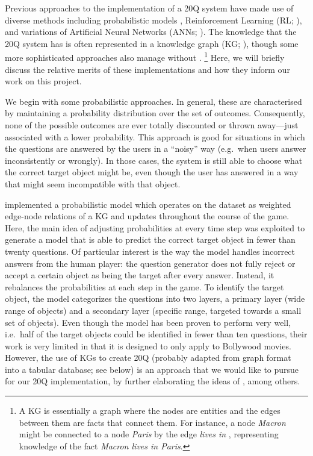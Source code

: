 \documentclass[11pt,a4paper]{article}
\begin{document}
Previous approaches to the implementation of a 20Q system have made use of diverse methods including probabilistic models \citep{DeyEa2019}, Reinforcement Learning (RL; \citealt{HuEa2018}), and variations of Artificial Neural Networks (ANNs; \citealt{ReddyEa2017, Burgener2006, ToninEa2018}).
The knowledge that the 20Q system has is often represented in a knowledge graph (KG; \citealt{DeyEa2019}), though some more sophisticated approaches also manage without \citep[e.g.][]{HuEa2018}.%
\footnote{A KG is essentially a graph where the nodes are entities and the edges between them are facts that connect them.
	For instance, a node \textit{Macron} might be connected to a node \textit{Paris} by the edge \textit{lives in} \citep[example from][]{GodinEa2019}, representing knowledge of the fact \textit{Macron lives in Paris}.}
Here, we will briefly discuss the relative merits of these implementations and how they inform our work on this project.

We begin with some probabilistic approaches.
In general, these are characterised by maintaining a probability distribution over the set of outcomes.
Consequently, none of the possible outcomes are ever totally discounted or thrown away---just associated with a lower probability.
This approach is good for situations in which the questions are answered by the users in a ``noisy'' way (e.g.\ when users answer inconsistently or wrongly).
In those cases, the system is still able to choose what the correct target object might be, even though the user has answered in a way that might seem incompatible with that object.

\citet{DeyEa2019} implemented a probabilistic model which operates on the dataset as weighted edge-node relations of a KG and updates throughout the course of the game. 
Here, the main idea of adjusting probabilities at every time step was exploited to generate a model that is able to predict the correct target object in fewer than twenty questions. 
Of particular interest is the way the model handles incorrect answers from the human player: the question generator does not fully reject or accept a certain object as being the target after every answer. 
Instead, it rebalances the probabilities at each step in the game. 
To identify the target object, the model categorizes the questions into two layers, a primary layer (wide range of objects) and a secondary layer (specific range, targeted towards a small set of objects). 
Even though the model has been proven to perform very well, i.e.\ half of the target objects could be identified in fewer than ten questions, their work is very limited in that it is designed to only apply to Bollywood movies. 
However, the use of KGs to create 20Q (probably adapted from graph format into a tabular database; see below) is an approach that we would like to pursue for our 20Q implementation, by further elaborating the ideas of \citet{DeyEa2019}, among others.
\end{document}

